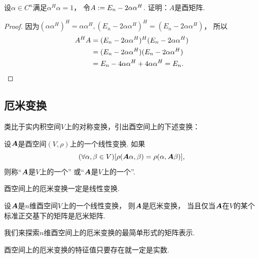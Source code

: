 \begin{example}
设\(\alpha \in C^n\)满足\(\alpha^H \alpha = 1\)，
令\(A := E_n - 2 \alpha \alpha^H\).
证明：\(A\)是酉矩阵.
\begin{proof}
因为\(
	(\alpha \alpha^H)^H
	= \alpha \alpha^H,
	(E_n - 2 \alpha \alpha^H)^H
	= (E_n - 2 \alpha \alpha^H)
\)，
所以\begin{align*}
	A^H A
	&= (E_n - 2 \alpha \alpha^H)^H (E_n - 2 \alpha \alpha^H) \\
	&= (E_n - 2 \alpha \alpha^H) (E_n - 2 \alpha \alpha^H) \\
	&= E_n - 4 \alpha \alpha^H + 4 \alpha \alpha^H
	= E_n.
	\qedhere
\end{align*}
\end{proof}
\end{example}

\subsection{厄米变换}
类比于实内积空间\(V\)上的对称变换，引出酉空间上的下述变换：
\begin{definition}
设\(\boldsymbol{A}\)是酉空间\((V,\rho)\)上的一个线性变换.
如果\begin{equation*}
	(\forall \alpha,\beta \in V)
	[
		\rho(\boldsymbol{A}\alpha,\beta)
		= \rho(\alpha,\boldsymbol{A}\beta)
	],
\end{equation*}
则称“\(\boldsymbol{A}\)是\(V\)上的一个”
或“\(\boldsymbol{A}\)是\(V\)上的一个”.
\end{definition}

\begin{proposition}
酉空间上的厄米变换一定是线性变换.
\end{proposition}

\begin{proposition}
设\(\boldsymbol{A}\)是\(n\)维酉空间\(V\)上的一个线性变换，
则\(\boldsymbol{A}\)是厄米变换，
当且仅当\(\boldsymbol{A}\)在\(V\)的某个标准正交基下的矩阵是厄米矩阵.
\end{proposition}

我们来探索\(n\)维酉空间上的厄米变换的最简单形式的矩阵表示.
\begin{proposition}
酉空间上的厄米变换的特征值只要存在就一定是实数.
\end{proposition}

